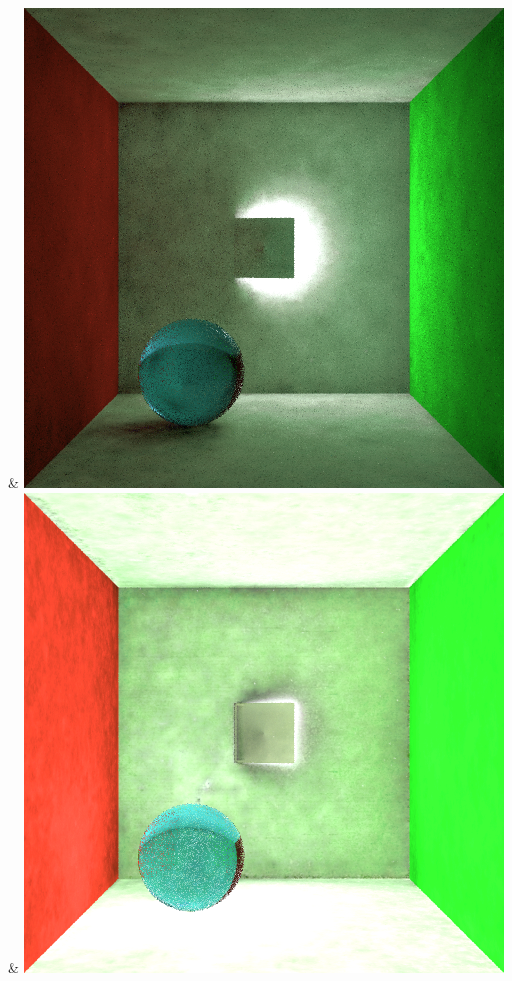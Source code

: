 & \includegraphics[width=\linewidth]{figures/py/tests/quality_comparison/nrc+bt_1spp_ajar_caustic.png}
& \includegraphics[width=\linewidth]{figures/py/tests/quality_comparison/nrc+lt_1spp_ajar_caustic.png}
